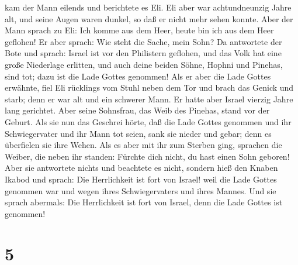 kam der Mann eilends und berichtete es Eli.  Eli aber war
achtundneunzig Jahre alt, und seine Augen waren dunkel, so daß er nicht
mehr sehen konnte.  Aber der Mann sprach zu Eli: Ich
komme aus dem Heer, heute bin ich aus dem Heer geflohen! Er aber sprach:
Wie steht die Sache, mein Sohn?  Da antwortete der Bote
und sprach: Israel ist vor den Philistern geflohen, und das Volk hat
eine große Niederlage erlitten, und auch deine beiden Söhne, Hophni und
Pinehas, sind tot; dazu ist die Lade Gottes genommen! 
Als er aber die Lade Gottes erwähnte, fiel Eli rücklings vom Stuhl neben
dem Tor und brach das Genick und starb; denn er war alt und ein schwerer
Mann. Er hatte aber Israel vierzig Jahre lang gerichtet. 
Aber seine Sohnsfrau, das Weib des Pinehas, stand vor der Geburt. Als
sie nun das Geschrei hörte, daß die Lade Gottes genommen und ihr
Schwiegervater und ihr Mann tot seien, sank sie nieder und gebar; denn
es überfielen sie ihre Wehen.  Als es aber mit ihr zum
Sterben ging, sprachen die Weiber, die neben ihr standen: Fürchte dich
nicht, du hast einen Sohn geboren! Aber sie antwortete nichts und
beachtete es nicht,  sondern hieß den Knaben Ikabod und
sprach: Die Herrlichkeit ist fort von Israel! weil die Lade Gottes
genommen war und wegen ihres Schwiegervaters und ihres Mannes.
 Und sie sprach abermals: Die Herrlichkeit ist fort von
Israel, denn die Lade Gottes ist genommen!

\hypertarget{section-4}{%
\section{5}\label{section-4}}

